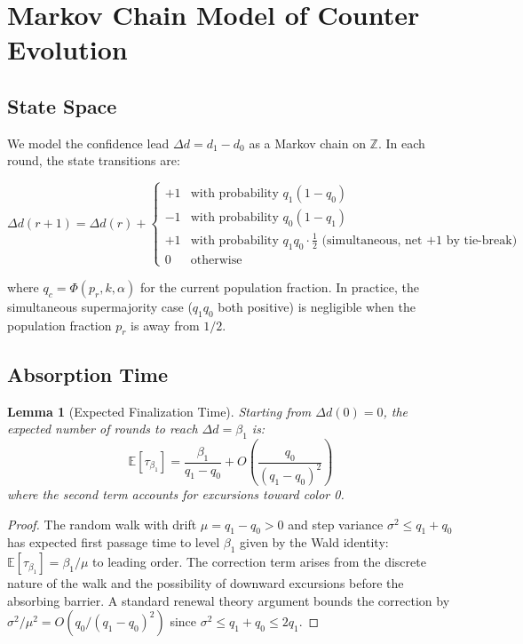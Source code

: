 \documentclass[11pt,a4paper]{article}
\newtheorem{lemma}[theorem]{Lemma}
\begin{document}
\section{Markov Chain Model of Counter Evolution}
\label{sec:markov}

\subsection{State Space}

We model the confidence lead $\Delta d = d_1 - d_0$ as a Markov chain on $\mathbb{Z}$.
In each round, the state transitions are:

\begin{equation}
\Delta d(r+1) = \Delta d(r) + \begin{cases}
+1 & \text{with probability } q_1(1 - q_0) \\
-1 & \text{with probability } q_0(1 - q_1) \\
+1 & \text{with probability } q_1 q_0 \cdot \frac{1}{2} \text{ (simultaneous, net +1 by tie-break)} \\
0 & \text{otherwise}
\end{cases}
\label{eq:markov}
\end{equation}

where $q_c = \Phi(p_r, k, \alpha)$ for the current population fraction. In practice,
the simultaneous supermajority case ($q_1 q_0$ both positive) is negligible when the
population fraction $p_r$ is away from $1/2$.

\subsection{Absorption Time}

\begin{lemma}[Expected Finalization Time]
\label{lem:absorption}
Starting from $\Delta d(0) = 0$, the expected number of rounds to reach $\Delta d = \beta_1$
is:
\[
\mathbb{E}[\tau_{\beta_1}] = \frac{\beta_1}{q_1 - q_0} + O\left(\frac{q_0}{(q_1 - q_0)^2}\right)
\]
where the second term accounts for excursions toward color 0.
\end{lemma}

\begin{proof}
The random walk with drift $\mu = q_1 - q_0 > 0$ and step variance $\sigma^2 \leq q_1 + q_0$
has expected first passage time to level $\beta_1$ given by the Wald identity:
$\mathbb{E}[\tau_{\beta_1}] = \beta_1 / \mu$ to leading order. The correction term
arises from the discrete nature of the walk and the possibility of downward excursions
before the absorbing barrier. A standard renewal theory argument bounds the correction
by $\sigma^2/\mu^2 = O(q_0/(q_1 - q_0)^2)$ since $\sigma^2 \leq q_1 + q_0 \leq 2q_1$.
\end{proof}
\end{document}
